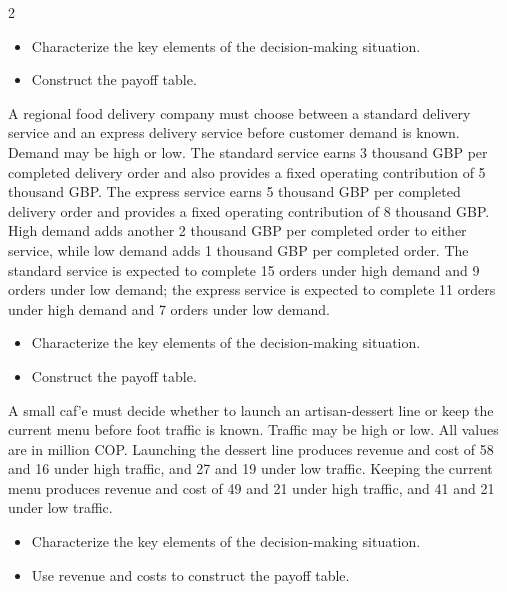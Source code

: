 \begin{multicols}{2}
		\begin{itemize}
			\item [\textbf{(C1)}] Characterize the key elements of the decision-making situation. 
			\item [\textbf{(C2)}] Construct the payoff table. 
		\end{itemize}
		
		\newpage 
		
		A regional food delivery company must choose between a standard delivery service and an express delivery service before customer demand is known. Demand may be high or low. The standard service earns 3 thousand GBP per completed delivery order and also provides a fixed operating contribution of 5 thousand GBP. The express service earns 5 thousand GBP per completed delivery order and provides a fixed operating contribution of 8 thousand GBP. High demand adds another 2 thousand GBP per completed order to either service, while low demand adds 1 thousand GBP per completed order. The standard service is expected to complete 15 orders under high demand and 9 orders under low demand; the express service is expected to complete 11 orders under high demand and 7 orders under low demand.
		
		\begin{itemize}
			\item [\textbf{(C1)}] Characterize the key elements of the decision-making situation. 
			\item [\textbf{(C2)}] Construct the payoff table. 
		\end{itemize}
		
		
		A small caf'e must decide whether to launch an artisan-dessert line or keep the current menu before foot traffic is known. Traffic may be high or low. All values are in million COP. Launching the dessert line produces revenue and cost of 58 and 16 under high traffic, and 27 and 19 under low traffic. Keeping the current menu produces revenue and cost of 49 and 21 under high traffic, and 41 and 21 under low traffic.
		
		\begin{itemize}
			\item [\textbf{(C1)}] Characterize the key elements of the decision-making situation. 
			\item [\textbf{(C3)}] Use revenue and costs to construct the payoff table. 
		\end{itemize}
		

\end{multicols}
